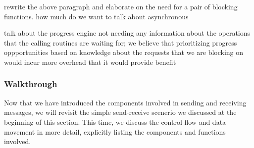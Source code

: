 \todo [BRT] rewrite the above paragraph and elaborate on the need for a pair
of blocking functions.  how much do we want to talk about asynchronous 

\todo talk about the progress engine not needing any information about the
operations that the calling routines are waiting for; we believe that
prioritizing progress oppportunities based on knowledge about the requests that
we are blocking on would incur more overhead that it would provide benefit


% 


\subsubsection{Walkthrough}
\label{sssec:walkthrough}


Now that we have introduced the components involved in sending and receiving
messages, we will revisit the simple send-receive scenerio we discussed at the
beginning of this section.  This time, we discuss the control flow and data
movement in more detail, explicitly listing the components and functions
involved.

